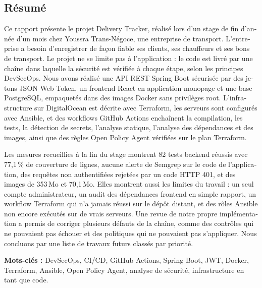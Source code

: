 \begin{otherlanguage}{french}
\chapter*{Résumé}
Ce rapport pr\'esente le projet Delivery Tracker, r\'ealis\'e lors d'un stage de fin d'ann\'ee d'un mois chez Youssra Trans-N\'egoce, une entreprise de transport. L'entreprise a besoin d'enregistrer de fa\c con fiable ses clients, ses chauffeurs et ses bons de transport. Le projet ne se limite pas \`a l'application : le code est livr\'e par une cha\^ine dans laquelle la s\'ecurit\'e est v\'erifi\'ee \`a chaque \'etape, selon les principes DevSecOps. Nous avons r\'ealis\'e une API REST Spring Boot s\'ecuris\'ee par des jetons JSON Web Token, un frontend React en application monopage et une base PostgreSQL, empaquet\'es dans des images Docker sans privil\`eges root. L'infrastructure sur DigitalOcean est d\'ecrite avec Terraform, les serveurs sont configur\'es avec Ansible, et des workflows GitHub Actions encha\^inent la compilation, les tests, la d\'etection de secrets, l'analyse statique, l'analyse des d\'ependances et des images, ainsi que des r\`egles Open Policy Agent v\'erifi\'ees sur le plan Terraform.

Les mesures recueillies \`a la fin du stage montrent 82 tests backend r\'eussis avec 77,1\,\% de couverture de lignes, aucune alerte de Semgrep sur le code de l'application, des requ\^etes non authentifi\'ees rejet\'ees par un code HTTP 401, et des images de 353\,Mo et 70,1\,Mo. Elles montrent aussi les limites du travail : un seul compte administrateur, un audit des d\'ependances frontend en simple rapport, un workflow Terraform qui n'a jamais r\'eussi sur le d\'ep\^ot distant, et des r\^oles Ansible non encore ex\'ecut\'es sur de vrais serveurs. Une revue de notre propre impl\'ementation a permis de corriger plusieurs d\'efauts de la cha\^ine, comme des contr\^oles qui ne pouvaient pas \'echouer et des politiques qui ne pouvaient pas s'appliquer. Nous concluons par une liste de travaux futurs class\'es par priorit\'e.

\textbf{Mots-cl\'es :} DevSecOps, CI/CD, GitHub Actions, Spring Boot, JWT, Docker, Terraform, Ansible, Open Policy Agent, analyse de s\'ecurit\'e, infrastructure en tant que code.
\end{otherlanguage}
\clearpage

\tableofcontents
\clearpage
\listoffigures
{}
\clearpage
\listoftables
{}
\clearpage

